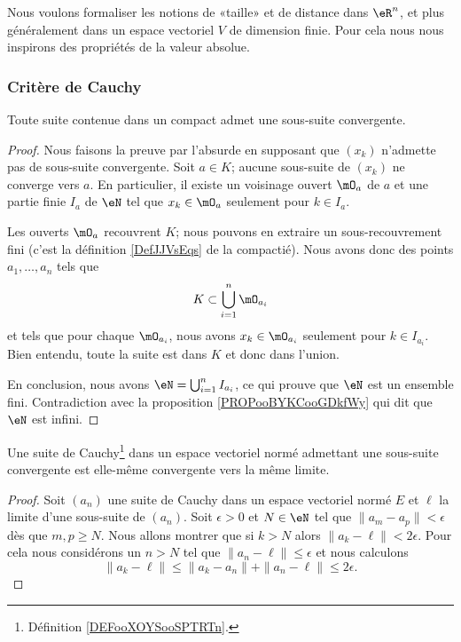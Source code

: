 Nous voulons formaliser les notions de «taille» et de distance dans $\eR^n$, et plus généralement dans un espace vectoriel $V$ de dimension finie. Pour cela nous nous inspirons des propriétés de la valeur absolue.

\subsubsection{Critère de Cauchy}

\begin{theorem}     \label{THOooRDYOooJHLfGq}
    Toute suite contenue dans un compact admet une sous-suite convergente.
\end{theorem}

\begin{proof}
    Nous faisons la preuve par l'absurde en supposant que \( (x_k)\) n'admette pas de sous-suite convergente. Soit \( a\in K\); aucune sous-suite de \( (x_k)\) ne converge vers \( a\). En particulier, il existe un voisinage ouvert \( \mO_a\) de \( a\) et une partie finie \( I_a\) de \( \eN\) tel que \( x_k\in \mO_a\) seulement pour \( k\in I_a\).

    Les ouverts \( \mO_a\) recouvrent \( K\); nous pouvons en extraire un sous-recouvrement fini (c'est la définition \ref{DefJJVsEqs} de la compactié). Nous avons donc des points \( a_1,\ldots, a_n\) tels que 
    \begin{equation}
        K\subset \bigcup_{i=1}^n\mO_{a_i}
    \end{equation}
    et tels que pour chaque \( \mO_{a_i}\), nous avons \( x_k\in \mO_{a_i}\) seulement pour \( k\in I_{a_i}\). Bien entendu, toute la suite est dans \( K\) et donc dans l'union.

    En conclusion, nous avons \( \eN=\bigcup_{i=1}^n I_{a_i}\), ce qui prouve que \( \eN\) est un ensemble fini. Contradiction avec la proposition \ref{PROPooBYKCooGDkfWy} qui dit que \( \eN\) est infini.
\end{proof}


\begin{lemma}
    Une suite de Cauchy\footnote{Définition \ref{DEFooXOYSooSPTRTn}.} dans un espace vectoriel normé admettant une sous-suite convergente est elle-même convergente vers la même limite.
\end{lemma}

\begin{proof}
    Soit \( (a_n)\) une suite de Cauchy dans un espace vectoriel normé \( E\) et \( \ell\) la limite d'une sous-suite de \( (a_n)\). Soit \( \epsilon>0\) et \( N\in \eN\) tel que \( \| a_m-a_p \|<\epsilon\) dès que \( m,p\geq N\). Nous allons montrer que si \( k>N\) alors \( \| a_k-\ell \|<2\epsilon\). Pour cela nous considérons un \( n>N\) tel que \( \| a_n-\ell \|\leq \epsilon\) et nous calculons
    \begin{equation}
        \| a_k-\ell \|\leq \| a_k-a_n \|+\| a_n-\ell \|\leq 2\epsilon.
    \end{equation}
\end{proof}

